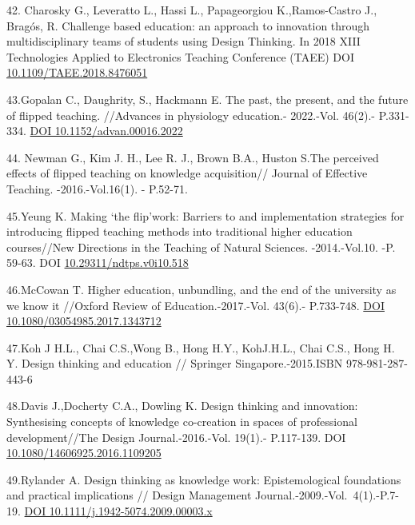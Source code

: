 \begin{references}
42. Charosky G., Leveratto L., Hassi L., Papageorgiou K.,Ramos-Castro
J., Bragós, R. Challenge based education: an approach to innovation
through multidisciplinary teams of students using Design Thinking. In
2018 XIII Technologies Applied to Electronics Teaching Conference (TAEE)
DOI \\\href{https://doi.org/10.1109/TAEE.2018.8476051}{10.1109/TAEE.2018.8476051}

43.Gopalan C., Daughrity, S., Hackmann E. The past, the present, and the
future of flipped teaching. //Advances in physiology education.-
2022.-Vol. 46(2).- P.331-334.
\href{https://doi.org/10.1152/advan.00016.2022}{DOI
10.1152/advan.00016.2022}

44. Newman G., Kim J. H., Lee R. J., Brown B.A., Huston S.The perceived
effects of flipped teaching on knowledge acquisition// Journal of
Effective Teaching. -2016.-Vol.16(1). - P.52-71.

45.Yeung K. Making `the flip'work: Barriers to and implementation
strategies for introducing flipped teaching methods into traditional
higher education courses//New Directions in the Teaching of Natural
Sciences. -2014.-Vol.10. -P. 59-63. DOI
\href{https://doi.org/10.29311/ndtps.v0i10.518}{10.29311/ndtps.v0i10.518}

46.McCowan T. Higher education, unbundling, and the end of the
university as we know it //Oxford Review of Education.-2017.-Vol.
43(6).- P.733-748.
\href{https://doi.org/10.1080/03054985.2017.1343712}{DOI
10.1080/03054985.2017.1343712}

47.Koh J H.L., Chai C.S.,Wong B., Hong H.Y., KohJ.H.L., Chai C.S., Hong
H. Y. Design thinking and education // Springer Singapore.-2015.ISBN
978-981-287-443-6

48.Davis J.,Docherty C.A., Dowling K. Design thinking and innovation:
Synthesising concepts of knowledge co-creation in spaces of professional
development//The Design Journal.-2016.-Vol. 19(1).- P.117-139. DOI
\href{http://dx.doi.org/10.1080/14606925.2016.1109205}{10.1080/14606925.2016.1109205}

49.Rylander A. Design thinking as knowledge work: Epistemological
foundations and practical implications // Design Management
Journal.-2009.-Vol.~4(1).-P.7-19.
\href{https://doi.org/10.1111/j.1942-5074.2009.00003.x}{DOI
10.1111/j.1942-5074.2009.00003.x}
\end{references}

